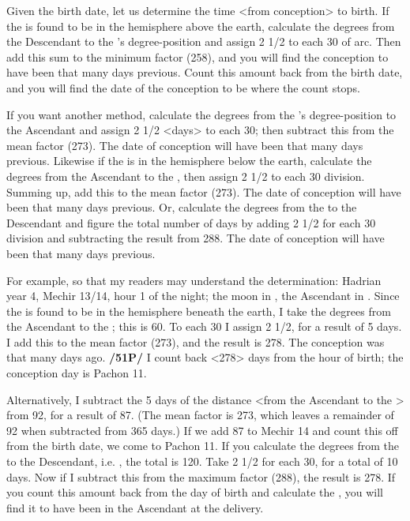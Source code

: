 Given the birth date, let us determine the time <from conception> to birth. If the \Moon\xspace is found to be in the hemisphere above the earth, calculate the degrees from the Descendant to the \Moon’s degree-position and assign 2 1/2 to each 30\deg\xspace of arc. Then add this sum to the minimum factor (258), and you will find the conception to have been that many days previous. Count this amount back from the birth date, and you will find the date of the conception to be where the count stops.

If you want another method, calculate the degrees from the \Moon’s degree-position to the Ascendant and assign 2 1/2 <days> to each 30\deg; then subtract this from the mean factor (273). The date of conception will have been that many days previous. Likewise if the \Moon\xspace is in the hemisphere below the earth, calculate the degrees from the Ascendant to the \Moon, then assign 2 1/2 to each 30\deg\xspace division. Summing up, add this to the mean factor (273). The date of conception will have been that many days previous. Or, calculate the degrees from the \Moon\xspace to the Descendant and figure the total number of days by adding 2 1/2 for each 30\deg\xspace division and subtracting the result from 288. The date of conception will have been that many days previous.

For example, so that my readers may understand the determination: Hadrian year 4, Mechir 13/14, hour 1 of the night; the moon in \Scorpio\xspace 7\deg, the Ascendant in \Virgo\xspace 7\deg. Since the \Moon\xspace is found to be in
the hemisphere beneath the earth, I take the degrees from the Ascendant to the \Moon; this is 60\deg. To each 30\deg\xspace I assign 2 1/2, for a result of 5 days. I add this to the mean factor (273), and the result is 278. The conception was that many days ago. \textbf{/51P/} I count back <278> days from the hour of birth; the conception day is Pachon 11.

Alternatively, I subtract the 5 days of the distance <from the Ascendant to the \Moon> from 92, for a result of 87. (The mean factor is 273, which leaves a remainder of 92 when subtracted from 365 days.) If we add 87 to Mechir 14 and count this off from the birth date, we come to Pachon 11. If you calculate the degrees from the \Moon\xspace to the Descendant, i.e. \Pisces\xspace 7\deg, the total is 120\deg. Take 2
1/2 for each 30\deg, for a total of 10 days. Now if I subtract this from the maximum factor (288), the result is 278. If you count this amount back from the day of birth and calculate the \Moon, you will find it to have been in the Ascendant at the delivery.

